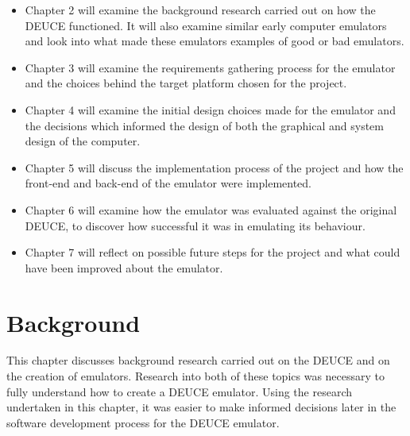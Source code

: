 \documentclass{l4proj}
\begin{document}
\begin{itemize}
	\item Chapter 2 will examine the background research carried out on how the DEUCE functioned. It will also examine similar early computer emulators and look into what made these emulators examples of good or bad emulators.
	\item Chapter 3 will examine the requirements gathering process for the emulator and the choices behind the target platform chosen for the project.
	\item Chapter 4 will examine the initial design choices made for the emulator and the decisions which informed the design of both the graphical and system design of the computer.
	\item Chapter 5 will discuss the implementation process of the project and how the front-end and back-end of the emulator were implemented.
	\item Chapter 6 will examine how the emulator was evaluated against the original DEUCE, to discover how successful it was in emulating its behaviour.
	\item Chapter 7 will reflect on possible future steps for the project and what could have been improved about the emulator. 
\end{itemize}

\chapter{Background}
This chapter discusses background research carried out on the DEUCE and on the creation of emulators. Research into both of these topics was necessary to fully understand how to create a DEUCE emulator. Using the research undertaken in this chapter, it was easier to make informed decisions later in the software development process for the DEUCE emulator.
\end{document}
